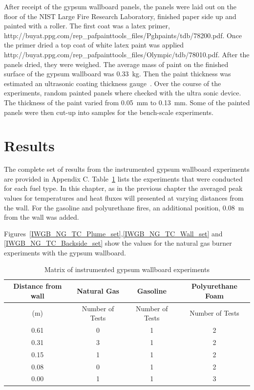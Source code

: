 \documentclass[twoside]{uocthesis}
\begin{document}
After receipt of the gypsum wallboard panels, the panels were laid out on the floor of the NIST Large Fire Research Laboratory, finished paper side up and painted with a roller.  The first coat was a latex primer, http://buyat.ppg.com/rep\_pafpainttools\_files/Pghpaints/tdb/78200.pdf.  Once the primer dried a top coat of white latex paint was applied http://buyat.ppg.com/rep\_pafpainttools\_files/Olympic/tdb/78010.pdf.  After the panels dried, they were weighed. The average mass of paint on the finished surface of the gypsum wallboard was 0.33~kg. Then the paint thickness was estimated an ultrasonic coating thickness gauge~\cite{defelsko}.  Over the course of the experiments, random painted panels where checked with the ultra sonic device. The thickness of the paint varied from 0.05~mm to 0.13~mm.  Some of the painted panels were then cut-up into samples for the bench-scale experiments.


\section{Results}

The complete set of results from the instrumented gypsum wallboard experiments are provided in Appendix C. Table~\ref{tab:IWGB_experiments} lists the experiments that were conducted for each fuel type.  In this chapter, as in the previous chapter the averaged peak values for temperatures and heat fluxes will presented at varying distances from the wall.  For the gasoline and polyurethane fires, an additional position, 0.08~m from the wall was added.

Figures~\ref{IWGB_NG_TC_Plume_set},\ref{IWGB_NG_TC_Wall_set} and \ref{IWGB_NG_TC_Backside_set} show the values for the natural gas burner experiments with the gypsum wallboard.

\begin{table}
	\centering
	\begin{tabular}{|c|c|c|c|}
		\hline Distance from wall  	& Natural Gas 		& Gasoline			& Polyurethane Foam \\
		\hline (m) 					& Number of Tests 	& Number of Tests  	& Number of Tests 	\\
		\hline 0.61 				& 0 				& 1 				& 2 			 	\\
		\hline 0.31					& 3	 				& 1					& 2 			 	\\
		\hline 0.15					& 1				 	& 1					& 2 			 	\\
		\hline 0.08					& 0 				& 1 				& 2 	 			\\
		\hline 0.00					& 1 				& 1 				& 3 	 			\\
		\hline
	\end{tabular}
	\caption[Matrix of instrumented gypsum wallboard experiments]{Matrix of instrumented gypsum wallboard experiments}
	\label{tab:IWGB_experiments}
\end{table}
\end{document}
